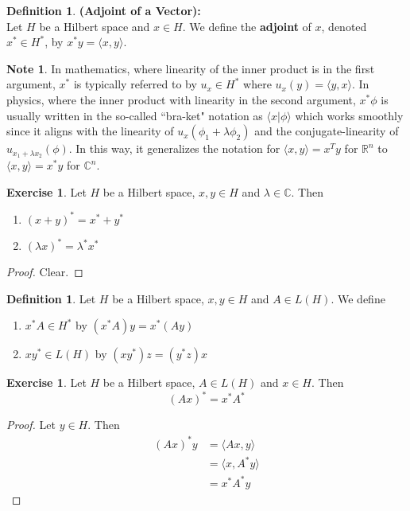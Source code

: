 \documentclass[12pt]{amsart}
\theoremstyle{definition}
\newtheorem{defn}[definition]{Definition}
\newtheorem{note}[definition]{Note}
\newtheorem{ex}[definition]{Exercise}
\newcommand{\lam}{\lambda}
\newcommand{\C}{\mathbb{C}}
\newcommand{\R}{\mathbb{R}}
\renewcommand{\r}{\rangle}
\renewcommand{\l}{\langle}
\newcommand{\lex}[1]{\label{ex:#1}}
\newcommand{\ld}[1]{\label{defn:#1}}
\begin{document}
\begin{defn} \ld{}\textbf{(Adjoint of a Vector):} \\
	Let $H$ be a Hilbert space and $x \in H$. We define the \textbf{adjoint} of $x$, denoted $x^* \in H^*$, by $x^* y = \l x, y \r$. 
\end{defn}

\begin{note}
	In mathematics, where linearity of the inner product is in the first argument, $x^{*}$ is typically referred to by $u_{x} \in H^{*} $ where $u_{x}(y) = \l y, x\r$. In physics, where the inner product with linearity in the second argument, $x^{*} \phi$ is usually written in the so-called ``bra-ket" notation as $\l x | \phi \r$ which works smoothly since it aligns with the linearity of $u_{x}(\phi_1 + \lam \phi_2)$ and the conjugate-linearity of $u_{x_1 + \lam x_2}(\phi)$. In this way, it generalizes the notation for $\l x, y\r = x^T y$ for $\R^n$ to $\l x, y\r = x^*y$ for $\C^n$. 
\end{note}

\begin{ex} \lex{}
	Let $H$ be a Hilbert space, $x, y \in H$ and $\lam \in \C$. Then 
	\begin{enumerate}
		\item $(x + y)^* =  x^* + y^*$
		\item $(\lam x)^* = \lam^* x^*$
	\end{enumerate}
\end{ex}

\begin{proof}
	Clear.
\end{proof}

\begin{defn} \ld{}
	Let $H$ be a Hilbert space, $x, y \in H$ and $A \in L(H)$. We define 
	\begin{enumerate}
		\item $x^* A \in H^*$ by $(x^*A) y = x^*(A y)$
		\item $x y^* \in L(H)$ by $(x y^*) z = (y^*z) x$
	\end{enumerate}
\end{defn}

\begin{ex} \lex{}
	Let $H$ be a Hilbert space, $A \in L(H)$ and $x \in H$. Then $$(A x)^*= x^*A^*$$
\end{ex}

\begin{proof}
	Let $y \in H$. Then 
	\begin{align*}
		(Ax)^*	y 
		&= \l Ax, y \r \\
		&= \l x, A^* y \r \\
		&= x^*A^* y
	\end{align*}
\end{proof}
\end{document}
